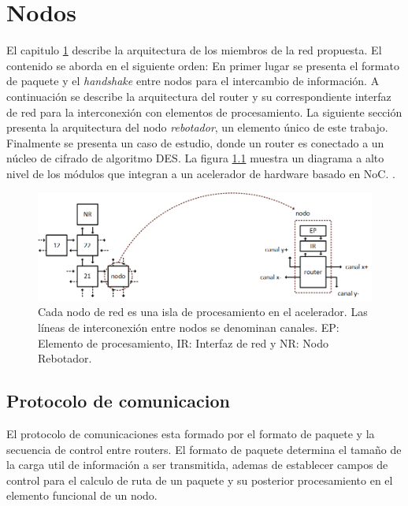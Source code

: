 \chapter{Nodos}
	\label{chap:nodo_de_red}

El capitulo \ref{chap:nodo_de_red} describe la arquitectura de los miembros de la red propuesta. El contenido se aborda en el siguiente orden: En primer lugar se presenta el formato de paquete y el \textit{handshake} entre nodos para el intercambio de información. A continuación se describe la arquitectura del router  y su correspondiente interfaz de red para la interconexión con elementos de procesamiento. La siguiente sección presenta la arquitectura del nodo \textit{rebotador}, un elemento único de este trabajo. Finalmente se presenta un caso de estudio, donde un router es conectado a un núcleo de cifrado de algoritmo DES\cite{chapter0:NIST:1977:DES}. La figura \ref{fig:ch4_nodo} muestra un diagrama a alto nivel de los módulos que integran a un acelerador de hardware basado en NoC.
.
\begin{figure}
	\includegraphics[width=\linewidth]{figures/ch4_nodo.png}
	\caption
		{	
			Cada nodo de red es una isla de procesamiento en el acelerador. Las líneas de interconexión entre nodos se denominan canales. EP: Elemento de procesamiento, IR: Interfaz de red y NR: Nodo Rebotador.
		}
	\label{fig:ch4_nodo}
\end{figure}

\section{Protocolo de comunicacion}
	\label{sec:protocolo_comunicacion}

El protocolo de comunicaciones esta formado por el formato de paquete y la secuencia de control entre routers. El formato de paquete determina el tamaño de la carga util de información a ser transmitida, ademas de establecer campos de control para el calculo de ruta de un paquete y su posterior procesamiento en el elemento funcional de un nodo.

